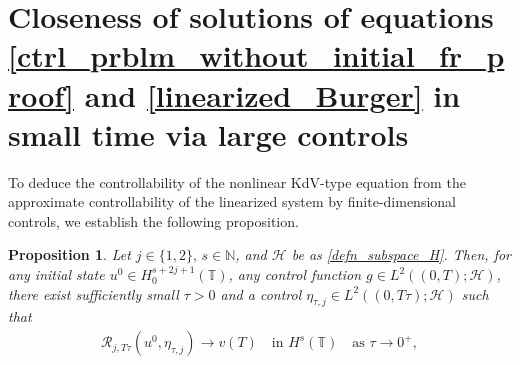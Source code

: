\documentclass[10pt, reqno]{amsart}
\newtheorem{proposition}{Proposition} [section]
\numberwithin{equation}{section}
\begin{document}
\section{Closeness of solutions of equations \eqref{ctrl_prblm_without_initial_fr_proof} and \eqref{linearized_Burger} in small time via large controls}\label{sec_4}
To deduce the controllability of the nonlinear KdV-type equation from the approximate controllability of the linearized system by finite-dimensional controls, we establish the following proposition.
\begin{proposition}\label{prpn_closeness_solun}
	Let \( j \in \{1, 2\}, \, s \in \mathbb{N} \), and \( \mathcal{H} \) be as \eqref{defn_subspace_H}. Then, for any initial state \( u^0 \in H^{s + 2j + 1}_0(\mathbb{T}) \), any control function \( g \in L^2((0, T); \mathcal{H}) \),  there exist sufficiently small \( \tau > 0 \) and a control \( \eta_{\tau, j} \in L^2((0, T\tau); \mathcal{H}) \) such that  
	\begin{align}\label{lim_closness_solun}
		\mathcal{R}_{j, T\tau}(u^0, \eta_{\tau, j})  \to v(T) \quad \text{in } H^s(\mathbb{T}) \quad \text{as } \tau \to 0^+,
	\end{align}
	

\end{proposition}
\end{document}
